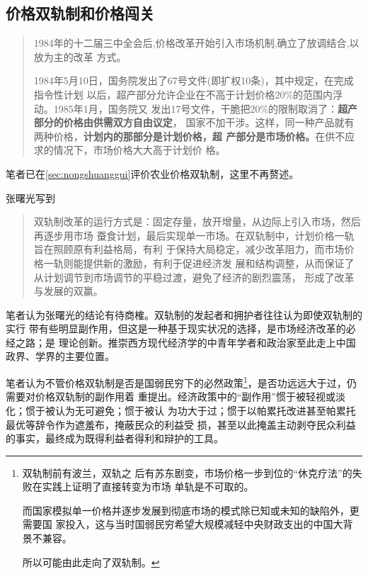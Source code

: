 
\subsection{价格双轨制和价格闯关}
\label{sec:qishuanggui}

\begin{quotation}
  1984年的十二届三中全会后,价格改革开始引入市场机制,确立了放调结合,以放为主的改革
  方式。\cite{wangqiangshehui}

  1984年5月10日，国务院发出了67号文件(即扩权10条)，其中规定，在完成指令性计划
  以后，超产部分允许企业在不高于计划价格20\%的范围内浮动。1985年1月，国务院又
  发出17号文件，干脆把20\%的限制取消了：\textbf{超产部分的价格由供需双方自由议定}，
  国家不加干涉。这样，同一种产品就有两种价格，\textbf{计划内的那部分是计划价格，超
    产部分是市场价格。}在供不应求的情况下，市场价格大大高于计划价
  格。\cite{yangshuanggui}
\end{quotation}

笔者已在\cref{sec:nongshuanggui}评价农业价格双轨制，这里不再赘述。

张曙光写到
\begin{quotation}
  双轨制改革的运行方式是：固定存量，放开增量，从边际上引入市场，然后再逐步用市场
  蚕食计划，最后实现单一市场。在双轨制中，计划价格一轨旨在照顾原有利益格局，有利
  于保持大局稳定，减少改革阻力，而市场价格一轨则能提供新的激励，有利于促进经济发
  展和结构调整，从而保证了从计划调节到市场调节的平稳过渡，避免了经济的剧烈震荡，
  形成了改革与发展的双赢。
\end{quotation}

笔者认为张曙光的结论有待商榷。双轨制的发起者和拥护者往往认为即使双轨制的实行
带有些明显副作用，但这是一种基于现实状况的选择，是市场经济改革的必经之路；是
理论创新。推崇西方现代经济学的中青年学者和政治家至此走上中国政界、学界的主要位置。

笔者认为不管价格双轨制是否是国弱民穷下的必然政策\footnote{双轨制前有波兰，双轨之
  后有苏东剧变，市场价格一步到位的“休克疗法”的失败在实践上证明了直接转变为市场
  单轨是不可取的。

  而国家模拟单一价格并逐步发展到彻底市场的模式除已知或未知的缺陷外，更需要国
  家投入，这与当时国弱民穷希望大规模减轻中央财政支出的中国大背景不兼容。

  所以可能由此走向了双轨制。}，是否功远远大于过，仍需要对价格双轨制的副作用着
重提出。经济政策中的“副作用”惯于被轻视或淡化；惯于被认为无可避免；惯于被认
为功大于过；惯于以帕累托改进甚至帕累托最优等辞令作为遮羞布，掩蔽民众的利益受
损，甚至以此掩盖主动剥夺民众利益的事实，最终成为既得利益者得利和辩护的工具。

